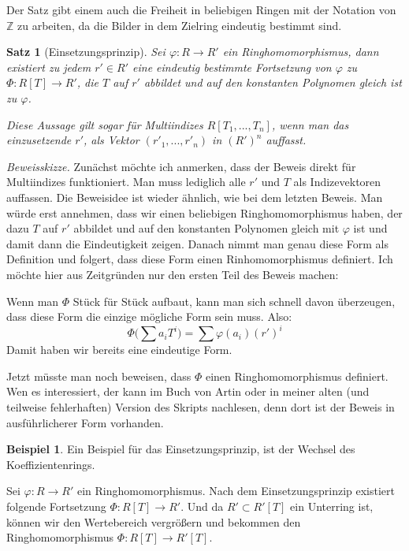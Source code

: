 \documentclass{article}
\newtheorem*{satz}{Satz}
\theoremstyle{definition}
\newtheorem*{zb}{Beispiel}
\theoremstyle{remark}
\begin{document}
Der Satz gibt einem auch die Freiheit in beliebigen Ringen mit der Notation von $\mathbb Z$ zu arbeiten, da die
Bilder in dem Zielring eindeutig bestimmt sind.

\begin{satz} [Einsetzungsprinzip] Sei $\varphi: R\to R'$ ein Ringhomomorphismus, dann existiert zu jedem
$r' \in R'$ eine eindeutig bestimmte Fortsetzung von $\varphi$ zu $\Phi:R[T] \to R'$, die $T$ auf $r'$ abbildet
und auf den konstanten Polynomen gleich ist zu $\varphi$.

\vspace{0.7em}
Diese Aussage gilt sogar für Multiindizes $R[T_1,...,T_n]$, wenn man das einzusetzende $r'$, als Vektor
$(r'_1,...,r'_n)$ in $(R')^n$ auffasst.
\end{satz}
\textit{Beweisskizze.} Zunächst möchte ich anmerken, dass der Beweis direkt für Multiindizes funktioniert.
Man muss lediglich alle $r'$ und $T$ als Indizevektoren auffassen.
Die Beweisidee ist wieder ähnlich, wie bei dem letzten Beweis. Man würde erst annehmen, dass wir einen
beliebigen Ringhomomorphismus haben, der dazu $T$ auf $r'$ abbildet und auf den konstanten Polynomen gleich mit
$\varphi$ ist und damit dann die Eindeutigkeit zeigen.
Danach nimmt man genau diese Form als Definition und folgert, dass diese Form einen Rinhomomorphismus definiert.
Ich möchte hier aus Zeitgründen nur den ersten Teil des Beweis machen:

\vspace{0.7em}
Wenn man $\Phi$ Stück für Stück aufbaut, kann man sich schnell davon überzeugen, dass diese Form die einzige
mögliche Form sein muss. Also:
\[\Phi\Big(\sum a_i T^i\Big) = \sum \varphi(a_i) (r')^i\]
Damit haben wir bereits eine eindeutige Form.

Jetzt müsste man noch beweisen, dass $\Phi$ einen Ringhomomorphismus definiert. Wen
es interessiert, der kann im Buch von Artin oder in meiner alten (und teilweise fehlerhaften) Version des
Skripts nachlesen, denn dort ist der Beweis in ausführlicherer Form vorhanden.

\begin{zb}
Ein Beispiel für das Einsetzungsprinzip, ist der Wechsel des Koeffizientenrings.

Sei $\varphi: R\to R'$ ein Ringhomomorphismus. Nach dem Einsetzungsprinzip existiert folgende Fortsetzung
$\Phi:R[T]\to R'$. Und da $R'\subset R'[T]$ ein Unterring ist, können wir den Wertebereich vergrößern und
bekommen den Ringhomomorphismus $\Phi:R[T]\to R'[T]$.
\end{zb}
\end{document}

